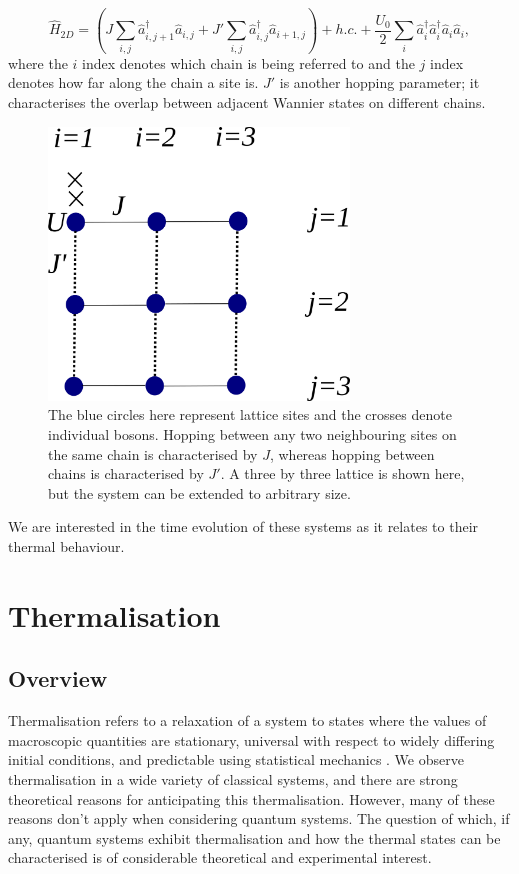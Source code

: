 \documentclass[a4paper,10pt]{article}
\theoremstyle{plain}
\begin{document}
\begin{equation}
\hat{H}_{2D}=(J\sum_{i,j}\hat{a}^\dagger_{i,j+1}\hat{a}_{i,j} + J'\sum_{i,j}\hat{a}^\dagger_{i,j}\hat{a}_{i+1,j})+h.c. +\frac{U_0}{2}\sum_{i}\hat{a}^\dagger_{i}\hat{a}^\dagger_{i}\hat{a}_{i}\hat{a}_{i},
\end{equation}
where the $i$ index denotes which chain is being referred to and the $j$ index denotes how far along the chain a site is. $J'$ is another hopping parameter; it characterises the
overlap between adjacent Wannier states on different chains.
\begin{figure}[H]
    \begin{center}
        \includegraphics[width=8cm]{lattice_pic}
    \end{center}
    \caption{The blue circles here represent lattice sites and the crosses
             denote individual bosons. Hopping between any two neighbouring
             sites on the same chain is characterised by $J$, whereas hopping
             between chains is characterised by $J'$. A three by three lattice
             is shown here, but the system can be extended to arbitrary size.
            }
\end{figure}
We are interested in the time evolution of these systems as it relates to their
thermal behaviour.


\section{Thermalisation}
 \subsection{Overview}

Thermalisation refers to a relaxation of a system to states where the values of macroscopic quantities are stationary, universal with respect to
widely differing initial conditions, and predictable using statistical mechanics \cite{Rigol2008}. We observe thermalisation in a wide variety of classical systems, and there
are strong theoretical reasons for anticipating this thermalisation. However, many of these reasons don't apply when considering quantum systems. The question of
which, if any, quantum systems exhibit thermalisation and how the thermal states can be characterised is of considerable theoretical and experimental interest.
\end{document}
